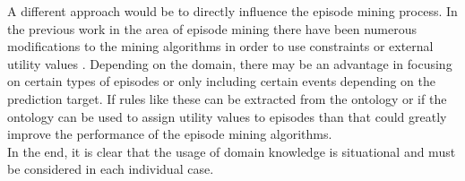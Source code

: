 A different approach would be to directly influence the episode mining process. In the previous work in the area of episode mining there have been numerous modifications to the mining algorithms in order to use constraints or external utility values \cite{meger2004constraint} \cite{wu2013mining}. Depending on the domain, there may be an advantage in focusing on certain types of episodes or only including certain events depending on the prediction target. If rules like these can be extracted from the ontology or if the ontology can be used to assign utility values to episodes than that could greatly improve the performance of the episode mining algorithms. \\
In the end, it is clear that the usage of domain knowledge is situational and must be considered in each individual case. 

